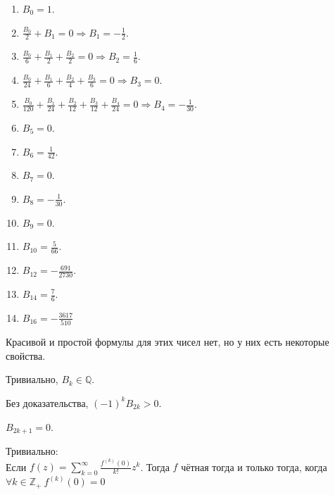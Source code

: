 \documentclass{article}
\begin{document}
    \begin{example}
        \begin{enumerate}
            \addtocounter{enumi}{-1}
            \item $B_0=1$.
            \item $\frac{B_0}2+B_1=0\Rightarrow B_1=-\frac12$.
            \item $\frac{B_0}6+\frac{B_1}2+\frac{B_2}2=0\Rightarrow B_2=\frac16$.
            \item $\frac{B_0}{24}+\frac{B_1}6+\frac{B_2}4+\frac{B_3}6=0\Rightarrow B_3=0$.
            \item $\frac{B_0}{120}+\frac{B_1}{24}+\frac{B_2}{12}+\frac{B_3}{12}+\frac{B_4}{24}=0\Rightarrow B_4=-\frac1{30}$.
            \item $B_5=0$.
            \item $B_6=\frac1{42}$.
            \item $B_7=0$.
            \item $B_8=-\frac1{30}$.
            \item $B_9=0$.
            \item $B_{10}=\frac5{66}$.
            \addtocounter{enumi}{1}
            \item $B_{12}=-\frac{691}{2730}$.
            \addtocounter{enumi}{1}
            \item $B_{14}=\frac76$.
            \addtocounter{enumi}{1}
            \item $B_{16}=-\frac{3617}{510}$
        \end{enumerate}
    \end{example}
    \begin{remark}
        Красивой и простой формулы для этих чисел нет, но у них есть некоторые свойства.
    \end{remark}
    \begin{property}
        Тривиально, $B_k\in\mathbb Q$.
    \end{property}
    \begin{property}
        Без доказательства, $(-1)^kB_{2k}>0$.
    \end{property}
    \begin{property}
        $B_{2k+1}=0$.
    \end{property}
    \begin{lemma}
        Тривиально:\\
        Если $f(z)=\sum\limits_{k=0}^\infty\frac{f^{(k)}(0)}{k!}z^k$. Тогда $f$ чётная тогда и только тогда, когда $\forall k\in\mathbb Z_+~f^{(k)}(0)=0$
    \end{lemma}
\end{document}

